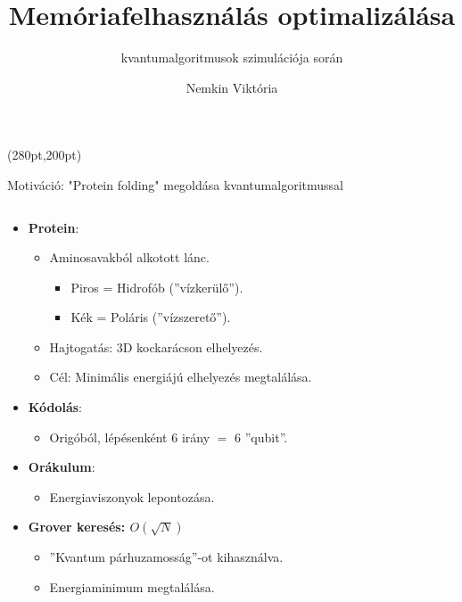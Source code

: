 \documentclass[aspectratio=169]{beamer}
\author[Nemkin Viktória]{Nemkin Viktória}
\institute[]{
\begin{small}dr. Friedl Katalin\end{small}\\
\begin{footnotesize}Számítástudományi és Információelméleti Tanszék\end{footnotesize}
}
\title{Memóriafelhasználás optimalizálása}
\subtitle{kvantumalgoritmusok szimulációja során}
\date{}
\begin{document}
\begin{frame}
\titlepage

\begin{textblock*}{150pt}(280pt,200pt) %

\end{textblock*}
\end{frame}


\begin{frame}{Motiváció: "Protein folding" megoldása kvantumalgoritmussal}
\begin{columns}
\begin{column}{0.55\textwidth}
\begin{itemize}
    \item \textbf{Protein}:
    \begin{itemize}
        \item Aminosavakból alkotott lánc.
        \begin{itemize}
          \item \color{red} Piros = Hidrofób (''vízkerülő'').
          \item \color{blue} Kék = Poláris (''vízszerető'').
        \end{itemize}
        \item Hajtogatás: 3D kockarácson elhelyezés.
        \item Cél: Minimális energiájú elhelyezés megtalálása.
    \end{itemize}
    \item \textbf{Kódolás}:
    \begin{itemize}
        \item Origóból, lépésenként $6$ irány $=$ $6$ ''qubit''.
    \end{itemize}
    \item \textbf{Orákulum}: 
    \begin{itemize}
        \item Energiaviszonyok lepontozása.
    \end{itemize}
    \item \textbf{Grover keresés: $O(\sqrt{N})$}
    \begin{itemize}
        \item ''Kvantum párhuzamosság''-ot kihasználva.
        \item Energiaminimum megtalálása.
    \end{itemize}
\end{itemize}
\end{column}
\begin{column}{0.45\textwidth}

\end{column}
\end{columns}
\end{frame}
\end{document}
